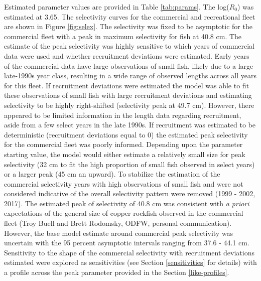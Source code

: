 \documentclass[11pt,
  english,
  a4paper,
]{article}
\begin{document}
\leavevmode\tagmcend\tagstructend


Estimated parameter values are provided in Table \ref{tab:params}. The log({\(R_0\)\leavevmode\tagmcend\tagstructend}) was estimated at 3.65. The selectivity curves for the commercial and recreational fleet are shown in Figure \ref{fig:selex}. The selectivity was fixed to be asymptotic for the commercial fleet with a peak in maximum selectivity for fish at 40.8 cm. The estimate of the peak selectivity was highly sensitive to which years of commercial data were used and whether recruitment deviations were estimated. Early years of the commercial data have large observations of small fish, likely due to a large late-1990s year class, resulting in a wide range of observed lengths across all years for this fleet. If recruitment deviations were estimated the model was able to fit these observations of small fish with large recruitment deviations and estimating selectivity to be highly right-shifted (selectivity peak at 49.7 cm). However, there appeared to be limited information in the length data regarding recruitment, aside from a few select years in the late 1990s. If recruitment was estimated to be deterministic (recruitment deviations equal to 0) the estimated peak selectivity for the commercial fleet was poorly informed. Depending upon the parameter starting value, the model would either estimate a relatively small size for peak selectivity (32 cm to fit the high proportion of small fish observed in select years) or a larger peak (45 cm an upward). To stabilize the estimation of the commercial selectivity years with high observations of small fish and were not considered indicative of the overall selectivity pattern were removed (1999 - 2002, 2017). The estimated peak of selectivity of 40.8 cm was consistent with \emph{a priori} expectations of the general size of copper rockfish observed in the commercial fleet (Troy Buell and Brett Rodomsky, ODFW, personal communication). However, the base model estimate around commercial peak selectivity was uncertain with the 95 percent asymptotic intervals ranging from 37.6 - 44.1 cm. Sensitivity to the shape of the commercial selectivity with recruitment deviations estimated were explored as sensitivities (see Section \ref{sensitivities} for details) with a profile across the peak parameter provided in the Section \ref{like-profiles}.

\leavevmode\tagmcend\tagstructend\par
\end{document}
